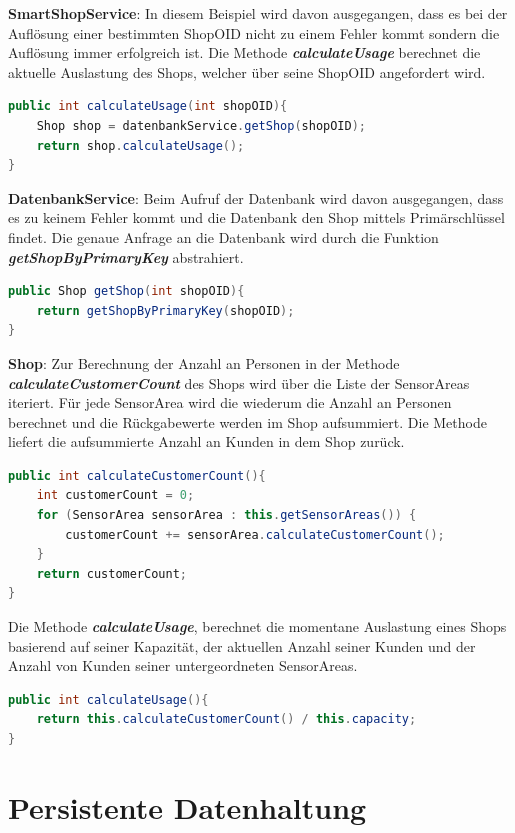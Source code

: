 \documentclass[runningheads]{llncs}
\begin{document}
\textbf{SmartShopService}: In diesem Beispiel wird davon ausgegangen, dass es bei der Auflösung einer bestimmten ShopOID nicht zu einem Fehler kommt sondern die Auflösung immer erfolgreich ist.
Die Methode \textbf{\textit{calculateUsage}} berechnet die aktuelle Auslastung des Shops, welcher über seine ShopOID angefordert wird.
\begin{lstlisting}[language=Java, basicstyle=\scriptsize]
public int calculateUsage(int shopOID){
	Shop shop = datenbankService.getShop(shopOID);
	return shop.calculateUsage();
}
\end{lstlisting}


\textbf{DatenbankService}: Beim Aufruf der Datenbank wird davon ausgegangen, dass es zu keinem Fehler kommt und die Datenbank den Shop mittels Primärschlüssel findet.
Die genaue Anfrage an die Datenbank wird durch die Funktion \textbf{\textit{getShopByPrimaryKey}} abstrahiert.
\begin{lstlisting}[language=Java, basicstyle=\scriptsize]
public Shop getShop(int shopOID){
	return getShopByPrimaryKey(shopOID);
}
\end{lstlisting}

\break
\textbf{Shop}: Zur Berechnung der Anzahl an Personen in der Methode \textbf{\textit{calculateCustomerCount}} des Shops wird über die Liste der SensorAreas iteriert.
Für jede SensorArea wird die wiederum die Anzahl an Personen berechnet und die Rückgabewerte werden im Shop aufsummiert.
Die Methode liefert die aufsummierte Anzahl an Kunden in dem Shop zurück.
\begin{lstlisting}[language=Java, basicstyle=\scriptsize]
public int calculateCustomerCount(){
	int customerCount = 0;
	for (SensorArea sensorArea : this.getSensorAreas()) {
		customerCount += sensorArea.calculateCustomerCount();
	}
	return customerCount;
}
\end{lstlisting}

Die Methode \textbf{\textit{calculateUsage}}, berechnet die momentane Auslastung eines Shops basierend auf seiner Kapazität, der aktuellen Anzahl seiner Kunden und der Anzahl von Kunden seiner untergeordneten SensorAreas.
\begin{lstlisting}[language=Java, basicstyle=\scriptsize]
public int calculateUsage(){
	return this.calculateCustomerCount() / this.capacity;
}
\end{lstlisting}

\newpage
\section{Persistente Datenhaltung}
\end{document}
